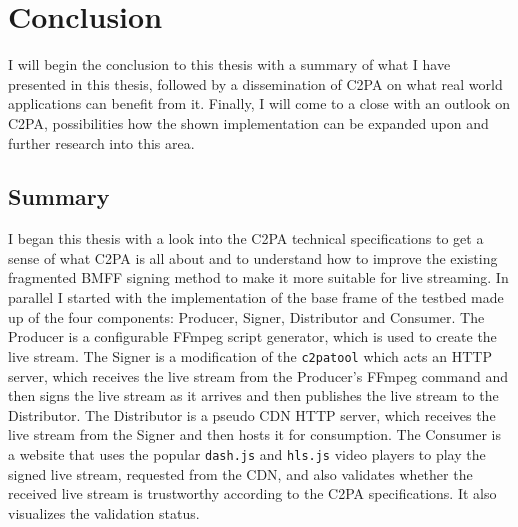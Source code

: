 \chapter{Conclusion\label{cha:chapter7}}

I will begin the conclusion to this thesis with a summary of what I have presented in this thesis, followed by a dissemination of C2PA on what real world applications can benefit from it. Finally, I will come to a close with an outlook on C2PA, possibilities how the shown implementation can be expanded upon and further research into this area.

\section{Summary\label{sec:summary}}

I began this thesis with a look into the C2PA technical specifications to get a sense of what C2PA is all about and to understand how to improve the existing fragmented BMFF signing method to make it more suitable for live streaming. In parallel I started with the implementation of the base frame of the testbed made up of the four components: Producer, Signer, Distributor and Consumer. The Producer is a configurable FFmpeg script generator, which is used to create the live stream. The Signer is a modification of the \texttt{c2patool} which acts an HTTP server, which receives the live stream from the Producer's FFmpeg command and then signs the live stream as it arrives and then publishes the live stream to the Distributor. The Distributor is a pseudo CDN HTTP server, which receives the live stream from the Signer and then hosts it for consumption. The Consumer is a website that uses the popular \texttt{dash.js} and \texttt{hls.js} video players to play the signed live stream, requested from the CDN, and also validates whether the received live stream is trustworthy according to the C2PA specifications. It also visualizes the validation status.

